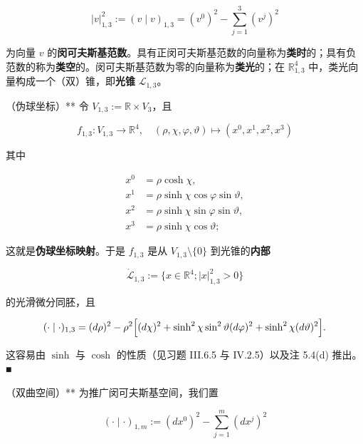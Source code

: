 \begin{example}
\begin{items}
\[
|v|^2_{1,3} := (v\mid v)_{1,3} = (v^0)^2 - \sum_{j=1}^{3}(v^j)^2
\]

为向量 $ v $ 的\textbf{闵可夫斯基范数}。具有正闵可夫斯基范数的向量称为\textbf{类时}的；具有负范数的称为\textbf{类空}的。闵可夫斯基范数为零的向量称为\textbf{类光}的；在 $ \mathbb{R}^4_{1,3} $ 中，类光向量构成一个（双）锥，即\textbf{光锥} $ \mathcal{L}_{1,3} $。

\end{items}


\textbf{
}

\begin{items}
\item[（j）]

（伪球坐标）** 令 $ V_{1,3} := \mathbb{R} \times V_3 $，且

\[
f_{1,3} : V_{1,3} \to \mathbb{R}^4, \quad (\rho, \chi, \varphi, \vartheta) \mapsto (x^0, x^1, x^2, x^3)
\]

其中

\begin{equation*}
\begin{aligned}
x^0 &= \rho \cosh\chi, \\ x^1 &= \rho \sinh\chi \cos\varphi \sin\vartheta, \\ x^2 &= \rho \sinh\chi \sin\varphi \sin\vartheta, \\ x^3 &= \rho \sinh\chi \cos\vartheta;
\end{aligned}
\end{equation*}

这就是\textbf{伪球坐标映射}。于是 $ f_{1,3} $ 是从 $ V_{1,3}\setminus\{0\} $ 到光锥的\textbf{内部}

\[
\mathring{\mathcal{L}}_{1,3} := \{ x \in \mathbb{R}^4 ; |x|^2_{1,3} > 0 \}
\]

的光滑微分同胚，且

\[
(\cdot\mid\cdot)_{1,3} = (d\rho)^2 - \rho^2\Bigl[ (d\chi)^2 + \sinh^2\chi \sin^2\vartheta (d\varphi)^2 + \sinh^2\chi (d\vartheta)^2 \Bigr].
\]

\proofhead
这容易由 $ \sinh $ 与 $ \cosh $ 的性质（见习题 III.6.5 与 IV.2.5）以及注 5.4(d) 推出。\nobreak\hspace{0.35em}■
\item[（k）]

（双曲空间）** 为推广闵可夫斯基空间，我们置

\[
(\cdot\mid\cdot)_{1,m} := (dx^0)^2 - \sum_{j=1}^{m}(dx^j)^2
\]


\end{items}
\end{example}
